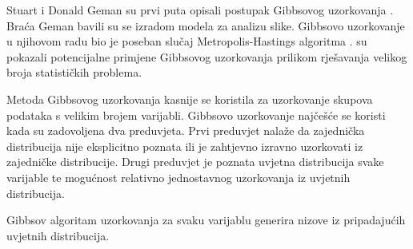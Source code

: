 Stuart i Donald Geman su prvi puta opisali postupak Gibbsovog uzorkovanja \citep{geman1984stochastic}. Braća Geman bavili su se izradom modela za analizu slike. Gibbsovo uzorkovanje u njihovom radu bio je poseban slučaj Metropolis-Hastings algoritma \citep{metropolis1953equation}. \citep{gelfand1990sampling} su pokazali potencijalne primjene Gibbsovog uzorkovanja prilikom rješavanja velikog broja statističkih problema.

Metoda Gibbsovog uzorkovanja kasnije se koristila za uzorkovanje skupova podataka s velikim brojem varijabli. Gibbsovo uzorkovanje najčešće se koristi kada su zadovoljena dva preduvjeta. Prvi preduvjet nalaže da zajednička distribucija  nije eksplicitno poznata ili je zahtjevno izravno uzorkovati iz zajedničke distribucije. Drugi preduvjet je poznata uvjetna distribucija svake varijable te mogućnost relativno jednostavnog uzorkovanja iz uvjetnih distribucija. 

Gibbsov algoritam uzorkovanja za svaku varijablu generira nizove iz pripadajućih uvjetnih distribucija.  